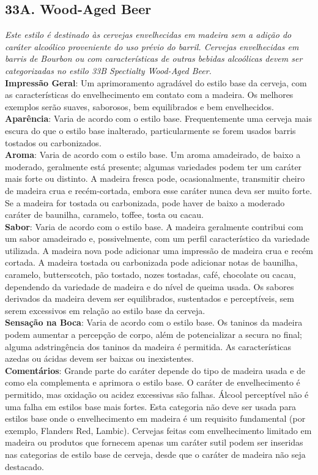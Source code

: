 \subsection*{33A. Wood-Aged Beer}
\textit{Este estilo é destinado às cervejas envelhecidas em madeira sem a adição do caráter alcoólico proveniente do uso prévio do barril. Cervejas envelhecidas em barris de Bourbon ou com características de outras bebidas alcoólicas devem ser categorizadas no estilo 33B Spectialty Wood-Aged Beer.}\\
\textbf{Impressão Geral}: Um aprimoramento agradável do estilo base da cerveja, com as características do envelhecimento em contato com a madeira. Os melhores exemplos serão suaves, saborosos, bem equilibrados e bem envelhecidos. \\
\textbf{Aparência}: Varia de acordo com o estilo base. Frequentemente uma cerveja mais escura do que o estilo base inalterado, particularmente se forem usados barris tostados ou carbonizados. \\
\textbf{Aroma}: Varia de acordo com o estilo base. Um aroma amadeirado, de baixo a moderado, geralmente está presente; algumas variedades podem ter um caráter mais forte ou distinto. A madeira fresca pode, ocasionalmente, transmitir cheiro de madeira crua e recém-cortada, embora esse caráter nunca deva ser muito forte. Se a madeira for tostada ou carbonizada, pode haver de baixo a moderado caráter de baunilha, caramelo, toffee, tosta ou cacau. \\
\textbf{Sabor}: Varia de acordo com o estilo base. A madeira geralmente contribui com um sabor amadeirado e, possivelmente, com um perfil característico da variedade utilizada. A madeira nova pode adicionar uma impressão de madeira crua e recém cortada. A madeira tostada ou carbonizada pode adicionar notas de baunilha, caramelo, butterscotch, pão tostado, nozes tostadas, café, chocolate ou cacau, dependendo da variedade de madeira e do nível de queima usada. Os sabores derivados da madeira devem ser equilibrados, sustentados e perceptíveis, sem serem excessivos em relação ao estilo base da cerveja. \\
\textbf{Sensação na Boca}: Varia de acordo com o estilo base. Os taninos da madeira podem aumentar a percepção de corpo, além de potencializar a secura no final; alguma adstringência dos taninos da madeira é permitida. As características azedas ou ácidas devem ser baixas ou inexistentes. \\
\textbf{Comentários}: Grande parte do caráter depende do tipo de madeira usada e de como ela complementa e aprimora o estilo base. O caráter de envelhecimento é permitido, mas oxidação ou acidez excessivas são falhas. Álcool perceptível não é uma falha em estilos base mais fortes. Esta categoria não deve ser usada para estilos base onde o envelhecimento em madeira é um requisito fundamental (por exemplo, Flanders Red, Lambic). Cervejas feitas com envelhecimento limitado em madeira ou produtos que fornecem apenas um caráter sutil podem ser inseridas nas categorias de estilo base de cerveja, desde que o caráter de madeira não seja destacado. \\
